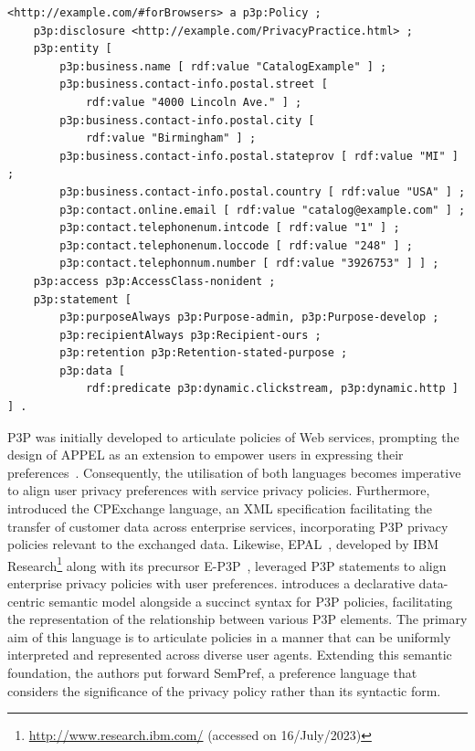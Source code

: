 \begin{listing}
\caption{P3P policy extracted from Example 3.1 of the P3P specification~\citep{cranor_platform_2002}, which specifies the privacy policy of CatalogExample.}
\label{list:p3p_example}
\begin{verbatim}
<http://example.com/#forBrowsers> a p3p:Policy ;
    p3p:disclosure <http://example.com/PrivacyPractice.html> ;
    p3p:entity [
        p3p:business.name [ rdf:value "CatalogExample" ] ;
        p3p:business.contact-info.postal.street [
            rdf:value "4000 Lincoln Ave." ] ;
        p3p:business.contact-info.postal.city [
            rdf:value "Birmingham" ] ;
        p3p:business.contact-info.postal.stateprov [ rdf:value "MI" ] ;
        p3p:business.contact-info.postal.country [ rdf:value "USA" ] ;
        p3p:contact.online.email [ rdf:value "catalog@example.com" ] ;
        p3p:contact.telephonenum.intcode [ rdf:value "1" ] ;
        p3p:contact.telephonenum.loccode [ rdf:value "248" ] ;
        p3p:contact.telephonnum.number [ rdf:value "3926753" ] ] ;
    p3p:access p3p:AccessClass-nonident ;
    p3p:statement [
        p3p:purposeAlways p3p:Purpose-admin, p3p:Purpose-develop ;
        p3p:recipientAlways p3p:Recipient-ours ;
        p3p:retention p3p:Retention-stated-purpose ;
        p3p:data [
            rdf:predicate p3p:dynamic.clickstream, p3p:dynamic.http ] ] .
\end{verbatim}
\end{listing}

P3P was initially developed to articulate policies of Web services, prompting the design of APPEL as an extension to empower users in expressing their preferences~\citep{cranor_p3p_2002}.
Consequently, the utilisation of both languages becomes imperative to align user privacy preferences with service privacy policies.
Furthermore, \cite{bohrer_customer_2000} introduced the CPExchange language, an XML specification facilitating the transfer of customer data across enterprise services, incorporating P3P privacy policies relevant to the exchanged data.
Likewise, EPAL~\citep{ashley_enterprise_2003}, developed by IBM Research\footnote{\url{http://www.research.ibm.com/} (accessed on 16/July/2023)} along with its precursor E-P3P~\citep{ashley_e-p3p_2002}, leveraged P3P statements to align enterprise privacy policies with user preferences.
\cite{li_semantics-base_2006} introduces a declarative data-centric semantic model alongside a succinct syntax for P3P policies, facilitating the representation of the relationship between various P3P elements.
The primary aim of this language is to articulate policies in a manner that can be uniformly interpreted and represented across diverse user agents.
Extending this semantic foundation, the authors put forward SemPref, a preference language that considers the significance of the privacy policy rather than its syntactic form.

